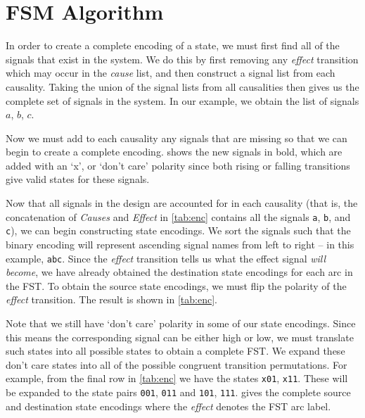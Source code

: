 \section{FSM Algorithm}\label{sec:algo}

In order to create a complete encoding of a state, we must first find all of the signals that exist in the system.
We do this by first removing any \emph{effect} transition which may occur in the \emph{cause} list, and then construct a signal list from each causality.
Taking the union of the signal lists from all causalities then gives us the complete set of signals in the system.
In our example, we obtain the list of signals $a$, $b$, $c$.

Now we must add to each causality any signals that are missing so that we can begin to create a complete encoding.
 shows the new signals in bold, which are added with an `x', or `don't care' polarity since both rising or falling transitions give valid states for these signals.

Now that all signals in the design are accounted for in each causality (that is, the concatenation of \emph{Causes} and \emph{Effect} in \cref{tab:enc} contains all the signals \texttt{a}, \texttt{b}, and \texttt{c}), we can begin constructing state encodings.
We sort the signals such that the binary encoding will represent ascending signal names from left to right -- in this example, \texttt{abc}.
Since the \emph{effect} transition tells us what the effect signal \emph{will become}, we have already obtained the destination state encodings for each arc in the FST\@.
To obtain the source state encodings, we must flip the polarity of the \emph{effect} transition.
The result is shown in \cref{tab:enc}.

Note that we still have `don't care' polarity in some of our state encodings.
Since this means the corresponding signal can be either high or low, we must translate such states into all possible states to obtain a complete FST\@.
We expand these don't care states into all of the possible congruent transition permutations.
For example, from the final row in \cref{tab:enc} we have the states \texttt{x01}, \texttt{x11}.
These will be expanded to the state pairs \texttt{001}, \texttt{011} and \texttt{101}, \texttt{111}.
 gives the complete source and destination state encodings where the \emph{effect} denotes the FST arc label.

